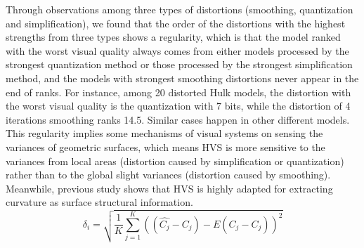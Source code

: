 Through observations among three types of distortions (smoothing, quantization and simplification), we found that the order of the distortions with the highest strengths from three types shows a regularity, which is that the model ranked with the worst visual quality always comes from either models processed by the strongest quantization method or those processed by the strongest simplification method, and the models with strongest smoothing distortions never appear in the end of ranks. For instance, among 20 distorted Hulk models, the distortion with the worst visual quality is the quantization with 7 bits, while the distortion of 4 iterations smoothing ranks 14.5.  Similar cases happen in other different models. This regularity implies some mechanisms of visual systems on sensing the variances of geometric surfaces, which means HVS is more sensitive to the variances from local areas (distortion caused by simplification or quantization) rather than to the global slight variances (distortion caused by smoothing). Meanwhile, previous study shows that HVS is highly adapted for extracting curvature as surface structural information.\\
\begin{equation}
\delta_i= \sqrt{\frac{1}{K}\sum_{j=1}^K{((\hat{C_j}-C_j)-E(\hat{C_j}-C_j))^2}}
\end{equation}